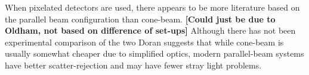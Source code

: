 \documentclass[12pt]{article}
\begin{document}
When pixelated detectors are used, there appears to be more literature based on the parallel beam configuration than cone-beam. \textbf{[Could just be due to Oldham, not based on difference of set-ups]}
Although there has not been experimental comparison of the two Doran suggests that while cone-beam is usually somewhat cheaper due to simplified optics, modern parallel-beam systems have better scatter-rejection and may have fewer stray light problems. \cite{Doran:2008kh, Olding:2011eta, Thomas:2011eja}



 

 






 


\end{document}
